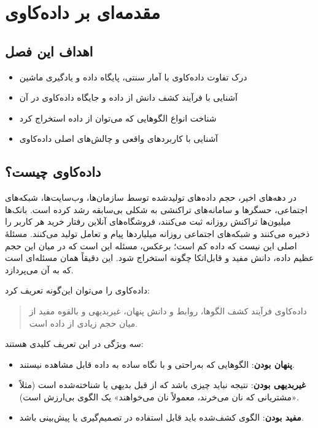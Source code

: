 \chapter{مقدمه‌ای بر داده‌کاوی}
\label{ch:intro}

\section*{اهداف این فصل}
\begin{itemize}
    \item درک تفاوت داده‌کاوی با آمار سنتی، پایگاه داده و یادگیری ماشین
    \item آشنایی با فرآیند کشف دانش از داده و جایگاه داده‌کاوی در آن
    \item شناخت انواع الگوهایی که می‌توان از داده استخراج کرد
    \item آشنایی با کاربردهای واقعی و چالش‌های اصلی داده‌کاوی
\end{itemize}

\section{داده‌کاوی چیست؟}

در دهه‌های اخیر، حجم داده‌های تولیدشده توسط سازمان‌ها، وب‌سایت‌ها، شبکه‌های اجتماعی،
حسگرها و سامانه‌های تراکنشی به شکلی بی‌سابقه رشد کرده است. بانک‌ها میلیون‌ها تراکنش
روزانه ثبت می‌کنند، فروشگاه‌های آنلاین رفتار خرید هر کاربر را ذخیره می‌کنند و شبکه‌های
اجتماعی روزانه میلیاردها پیام و تعامل تولید می‌کنند. مسئلهٔ اصلی این نیست که داده کم
است؛ برعکس، مسئله این است که در میان این حجم عظیم داده، دانش مفید و قابل‌اتکا چگونه
استخراج شود. این دقیقاً همان مسئله‌ای است که 
به آن می‌پردازد.

داده‌کاوی را می‌توان این‌گونه تعریف کرد:

\begin{quote}
داده‌کاوی فرآیند کشف الگوها، روابط و دانش پنهان، غیربدیهی و بالقوه مفید از میان
حجم زیادی از داده است.
\end{quote}

سه ویژگی در این تعریف کلیدی هستند:

\begin{itemize}
    \item \textbf{پنهان بودن}: الگوهایی که به‌راحتی و با نگاه ساده به داده قابل مشاهده نیستند.
    \item \textbf{غیربدیهی بودن}: نتیجه نباید چیزی باشد که از قبل بدیهی یا شناخته‌شده است
          (مثلاً «مشتریانی که نان می‌خرند، معمولاً نان می‌خواهند» یک الگوی بی‌ارزش است).
    \item \textbf{مفید بودن}: الگوی کشف‌شده باید قابل استفاده در تصمیم‌گیری یا پیش‌بینی باشد.
\end{itemize}

